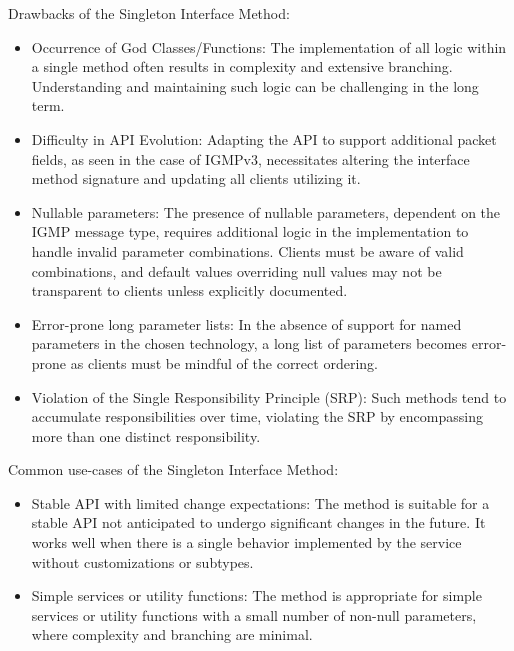 Drawbacks of the Singleton Interface Method:

\begin{itemize}
    \item Occurrence of God Classes/Functions:
    The implementation of all logic within a single method often results in complexity and extensive branching.
    Understanding and maintaining such logic can be challenging in the long term.
    \item Difficulty in API Evolution:
    Adapting the API to support additional packet fields, as seen in the case of IGMPv3,
    necessitates altering the interface method signature and updating all clients utilizing it.
    \item Nullable parameters:
    The presence of nullable parameters, dependent on the IGMP message type, requires additional logic
    in the implementation to handle invalid parameter combinations.
    Clients must be aware of valid combinations, and default values overriding null values may not be transparent
    to clients unless explicitly documented.
    \item Error-prone long parameter lists:
    In the absence of support for named parameters in the chosen technology, a long list of parameters becomes
    error-prone as clients must be mindful of the correct ordering.
    \item Violation of the Single Responsibility Principle (SRP):
    Such methods tend to accumulate responsibilities over time, violating the SRP by encompassing more than one
    distinct responsibility.
\end{itemize}

Common use-cases of the Singleton Interface Method:

\begin{itemize}
    \item Stable API with limited change expectations:
    The method is suitable for a stable API not anticipated to undergo significant changes in the future.
    It works well when there is a single behavior implemented by the service without customizations or subtypes.
    \item Simple services or utility functions:
    The method is appropriate for simple services or utility functions with a small number of non-null parameters,
    where complexity and branching are minimal.
\end{itemize}
